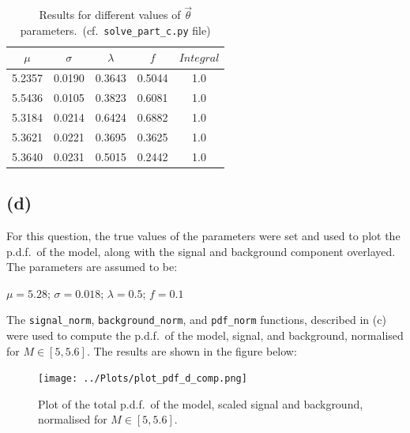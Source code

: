 \documentclass[12pt]{report} %
\begin{document}
\begin{center}
    \begin{table}[htbp]
        \begin{tabular}{ |c|c|c|c|c| } 
            \hline
            $\mu$ & $\sigma$ & $\lambda$ & $f$ & $Integral$ \\ 
            \hline
            5.2357 & 0.0190 & 0.3643 & 0.5044 & 1.0 \\ 
            \hline
            5.5436 & 0.0105 & 0.3823 & 0.6081 & 1.0 \\ 
            \hline
            5.3184 & 0.0214 & 0.6424 & 0.6882 & 1.0 \\ 
            \hline
            5.3621 & 0.0221 & 0.3695 & 0.3625 & 1.0 \\ 
            \hline
            5.3640 & 0.0231 & 0.5015 & 0.2442 & 1.0 \\ 
            \hline
        \end{tabular}
        \centering
        \caption{Results for different values of $\vec{\theta}$ parameters.\ (cf.\ \texttt{solve\_part\_c.py} file)}
    \end{table}
\end{center}

\subsection*{(d)}

For this question, the true values of the parameters were set and used to plot the p.d.f.\ of the model, along with the signal and background component overlayed. The parameters are assumed to be:

\begin{center}
    $\mu = 5.28$;  
    $\sigma = 0.018$; 
    $\lambda = 0.5$; 
    $f = 0.1$
\end{center}

The \texttt{signal\_norm}, \texttt{background\_norm}, and \texttt{pdf\_norm} functions, described in (c) were used to compute the p.d.f.\ of the model, signal, and background, normalised for $M\in{[5,5.6]}$. The results are shown in the figure below:

\newpage

\begin{figure}[htbp]
    \centering
    \texttt{[image: ../Plots/plot\_pdf\_d\_comp.png]}
    \captionsetup{margin=1.3cm}
    \caption[width=0.2\pdfpagewidth]{Plot of the total p.d.f.\ of the model, scaled signal and background, normalised for $M\in{[5,5.6]}$.}
\end{figure}  
\end{document}
